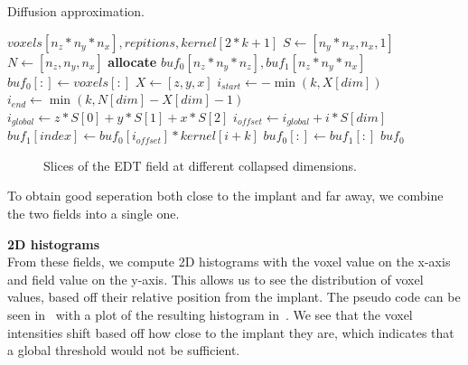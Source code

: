 \begin{algorithm}
    \caption{Diffusion approximation.}
    \label{alg:diffusion}
    \begin{algorithmic}
         {$voxels[n_z*n_y*n_x], repitions, kernel[2*k+1]$}
            \State $S \gets [n_y * n_x, n_x, 1]$
            \State $N \gets [n_z, n_y, n_x]$
            \State \textbf{allocate} $buf_0[n_z*n_y*n_z], buf_1[n_z*n_y*n_x]$
            \State $buf_0[:] \gets voxels[:]$
                        \State $X \gets [z,y,x]$
                        \State $i_{start} \gets - \min (k, X[dim])$
                        \State $i_{end} \gets \min (k, N[dim] - X[dim] - 1)$
                        \State $i_{global} \gets z*S[0] + y*S[1] + x*S[2]$
                            \State $i_{offset} \gets i_{global} + i*S[dim]$
                            \State $buf_1[index] \gets buf_0[i_{offset}] * kernel[i+k]$
                        \EndFor
                    \EndFor
                    \State $buf_0[:] \gets buf_1[:]$
                \EndFor
            \EndFor
            \Return $buf_0$
        \EndFunction
    \end{algorithmic}
\end{algorithm}

\begin{figure}
    \caption{Slices of the EDT field at different collapsed dimensions.}
    \label{fig:field-slices}
\end{figure}

To obtain good seperation both close to the implant and far away, we combine the two fields into a single one.


\vspace{\baselineskip}
\noindent\textbf{2D histograms} \\

From these fields, we compute 2D histograms with the voxel value on the x-axis and field value on the y-axis.
This allows us to see the distribution of voxel values, based off their relative position from the implant.
The pseudo code can be seen in~ with a plot of the resulting histogram in~.
We see that the voxel intensities shift based off how close to the implant they are, which indicates that a global threshold would not be sufficient.

